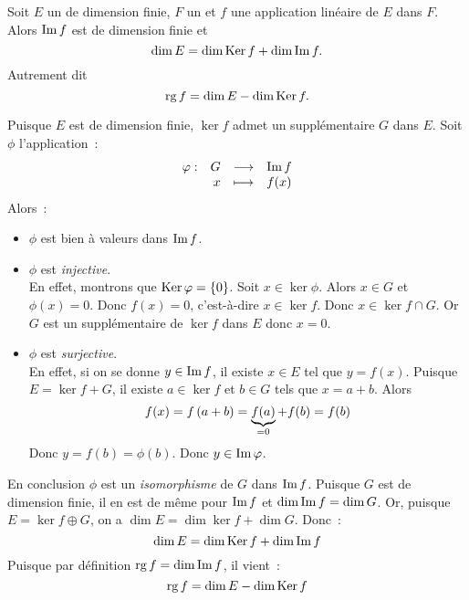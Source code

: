 \documentclass{magnolia}
\begin{document}




\begin{theoreme}[utile=3, nom=Théorème du rang]
Soit $E$ un \Kev de dimension finie, $F$ un \Kev et $f$ une application
linéaire de $E$ dans $F$. Alors $\operatorname{Im} f$ est de dimension finie et
\[\dim E=\dim\mathop{\rm Ker} f+\dim\operatorname{Im} f.\]
Autrement dit
\[\operatorname{rg} f=\dim E-\dim\mathop{\rm Ker} f.\]
\end{theoreme}
\begin{preuve}
Puisque $E$ est de dimension finie, $\ker f$ admet un supplémentaire $G$ dans
$E$. Soit $\phi$ l'application~:
\[\begin{array}[t]{lrcl} \displaystyle{\varphi} : & \displaystyle{G} & \longrightarrow & \displaystyle{\operatorname{Im}f} \\ & \displaystyle{x} & \longmapsto & \displaystyle{f(x)} \end{array}\]
Alors~:
\begin{itemize}
\item $\phi$ est bien à valeurs dans $\operatorname{Im} f$.
\item $\phi$ est {\it injective}.\\
  En effet, montrons que $\mathop{\rm Ker}\varphi=\left\{0\right\}$. Soit
  $x\in\ker\phi$. Alors $x\in G$ et $\phi(x)=0$. Donc $f(x)=0$,
  c'est-à-dire $x\in\ker f$. Donc $x\in\ker f\cap G$. Or $G$ est un
  supplémentaire de $\ker f$ dans $E$ donc $x=0$.
\item $\phi$ est {\it surjective}.\\
  En effet, si on se donne $y\in\operatorname{Im} f$, il existe
  $x\in E$ tel que $y=f(x)$. Puisque $E=\ker f+G$, il existe $a\in\ker f$ et
  $b\in G$ tels que $x=a+b$. Alors
  \[f(x)=f\left(a+b\right)=\underbrace{f(a)}_{=0}+f(b)=f(b)\]
  Donc $y=f(b)=\phi(b)$. Donc $y\in\operatorname{Im}\varphi$.
\end{itemize}
En conclusion $\phi$ est un {\it isomorphisme} de $G$ dans $\operatorname{Im} f$. Puisque $G$
est de dimension finie, il en est de même pour $\operatorname{Im} f$ et $\dim\operatorname{Im} f=\dim G$.
Or, puisque $E=\ker f\oplus G$, on a $\dim E=\dim \ker f+\dim G$. Donc~:
\[\dim E=\dim\mathop{\rm Ker} f+\dim\operatorname{Im} f\]
Puisque par définition $\operatorname{rg} f=\dim\operatorname{Im} f$, il vient~:
\[\operatorname{rg} f=\dim E-\dim\mathop{\rm Ker} f\]
\end{preuve}
\end{document}
